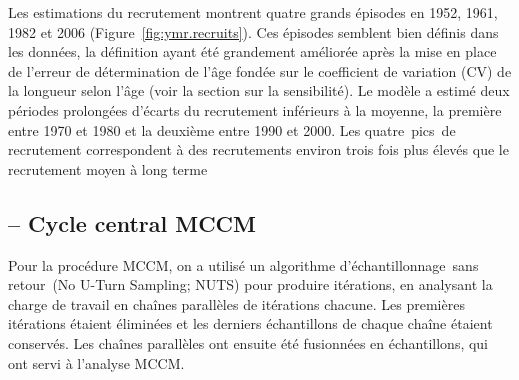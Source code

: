 \documentclass[11pt]{book}
\newcommand{\angL}{\guillemotleft\,}
\newcommand{\angR}{\,\guillemotright}
\begin{document}
Les estimations du recrutement montrent quatre grands \'{e}pisodes en 1952, 1961, 1982 et 2006 (Figure~\ref{fig:ymr.recruits}).
Ces \'{e}pisodes semblent bien d\'{e}finis dans les donn\'{e}es, la d\'{e}finition ayant \'{e}t\'{e} grandement am\'{e}lior\'{e}e apr\`{e}s la mise en place de l'erreur de d\'{e}termination de l'\^{a}ge fond\'{e}e sur le coefficient de variation (CV) de la longueur selon l'\^{a}ge (voir la section sur la sensibilit\'{e}).
Le mod\`{e}le a estim\'{e} deux p\'{e}riodes prolong\'{e}es d'\'{e}carts du recrutement inf\'{e}rieurs \`{a} la moyenne, la premi\`{e}re entre 1970 et 1980 et la deuxi\`{e}me entre 1990 et 2000.
Les quatre \angL{}pics\angR{} de recrutement correspondent \`{a} des recrutements environ trois fois plus \'{e}lev\'{e}s que le recrutement moyen \`{a} long terme
\newpage

\graphicspath{{C:/Users/haighr/Files/GFish/PSARC/PSARC_2020s/PSARC21/YMR/Data/SS/YMR2021/Run75/MPD.75.01/french/}}
\clearpage

\subsection{\SPC{} -- Cycle central MCCM }


Pour la proc\'{e}dure MCCM, on a utilis\'{e} un algorithme d'\'{e}chantillonnage \angL{}sans retour\angR{} (No U-Turn Sampling; NUTS) \citep{Monnahan-Kristensen:2018, Monnahan-etal:2019} pour produire \nSims{} it\'{e}rations, en analysant la charge de travail en \nChains{} cha\^{i}nes parall\`{e}les \citep{R:2015_snowfall} de \cSims{} it\'{e}rations chacune. Les \cBurn{} premi\`{e}res it\'{e}rations \'{e}taient \'{e}limin\'{e}es et les \cSamps{} derniers \'{e}chantillons de chaque cha\^{i}ne \'{e}taient conserv\'{e}s.
Les cha\^{i}nes parall\`{e}les ont ensuite \'{e}t\'{e} fusionn\'{e}es en \Nmcmc{} \'{e}chantillons, qui ont servi \`{a} l'analyse MCCM.
\end{document}

